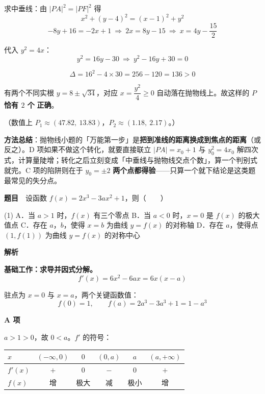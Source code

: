求中垂线：由 $|PA|^{2}=|PF|^{2}$ 得
\[x^{2}+(y-4)^{2}=(x-1)^{2}+y^{2}\]
\[-8y+16=-2x+1\ \Longrightarrow\ 2x=8y-15\ \Longrightarrow\ x=4y-\frac{15}2\]

代入 $y^{2}=4x$：
\[y^{2}=16y-30\ \Longrightarrow\ y^{2}-16y+30=0\]

\[\Delta=16^{2}-4\times30=256-120=136>0\]

有两个不同实根 $y=8\pm\sqrt{34}$，对应 $x=\dfrac{y^{2}}4\ge0$ 自动落在抛物线上。故这样的 $P$ \textbf{恰有 $2$ 个}  \textbf{正确}。

（数值上 $P_1\approx(47.82,\ 13.83)$，$P_2\approx(1.18,\ 2.17)$。）


\begin{gktip}
\textbf{方法总结}：抛物线小题的「万能第一步」是\textbf{把到准线的距离换成到焦点的距离}（或反之）。D 项如果不做这个转化，就要直接联立 $|PA|=x_0+1$ 与 $y_0^2=4x_0$ 解四次式，计算量陡增；转化之后立刻变成「中垂线与抛物线交点个数」，算一个判别式就完。C 项的陷阱则在于 $y_0=\pm2$ \textbf{两个点都得验}——只算一个就下结论是这类题最常见的失分点。
\end{gktip}

\par\medskip


\textbf{题目}　设函数 $f(x)=2x^{3}-3ax^{2}+1$，则（　　）

\begin{gkopts}(1)
\task A．当 $a>1$ 时，$f(x)$ 有三个零点
\task B．当 $a<0$ 时，$x=0$ 是 $f(x)$ 的极大值点
\task C．存在 $a$，$b$，使得 $x=b$ 为曲线 $y=f(x)$ 的对称轴
\task D．存在 $a$，使得点 $\left(1,f(1)\right)$ 为曲线 $y=f(x)$ 的对称中心
\end{gkopts}

\textbf{解析}

\textbf{基础工作：求导并因式分解。}
\[f'(x)=6x^{2}-6ax=6x(x-a)\]

驻点为 $x=0$ 与 $x=a$，两个关键函数值：
\[f(0)=1,\qquad f(a)=2a^{3}-3a^{3}+1=1-a^{3}\]

\par\medskip

\textbf{A 项}

$a>1>0$，故 $0<a$。$f'$ 的符号：

\begin{center}
\begin{tabular}{lccccc}
\toprule
$x$ & $(-\infty,0)$ & $0$ & $(0,a)$ & $a$ & $(a,+\infty)$ \\
\midrule
$f'(x)$ & $+$ & $0$ & $-$ & $0$ & $+$ \\
$f(x)$ & 增 & 极大 & 减 & 极小 & 增 \\
\bottomrule
\end{tabular}
\end{center}

